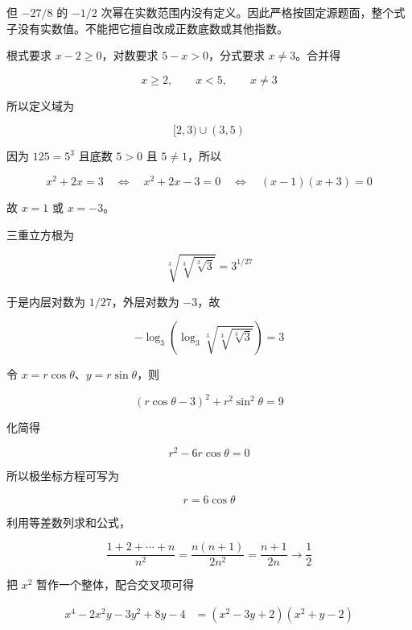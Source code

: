 \begin{answer}
但 $-27/8$ 的 $-1/2$ 次幂在实数范围内没有定义。因此严格按固定源题面，整个式子没有实数值。不能把它擅自改成正数底数或其他指数。


根式要求 $x-2\ge0$，对数要求 $5-x>0$，分式要求 $x\ne3$。合并得

\nopagebreak[4]
\[
x\ge2,\qquad x<5,\qquad x\ne3
\]

所以定义域为

\nopagebreak[4]
\[
[2,3)\cup(3,5)
\]


因为 $125=5^3$ 且底数 $5>0$ 且 $5\ne1$，所以

\nopagebreak[4]
\[
x^2+2x=3
\quad\Longleftrightarrow\quad
x^2+2x-3=0
\quad\Longleftrightarrow\quad
(x-1)(x+3)=0
\]

故 $x=1$ 或 $x=-3$。


三重立方根为

\nopagebreak[4]
\[
\sqrt[3]{\sqrt[3]{\sqrt[3]{3}}}=3^{1/27}
\]

于是内层对数为 $1/27$，外层对数为 $-3$，故

\nopagebreak[4]
\[
-\log_3\left(\log_3\sqrt[3]{\sqrt[3]{\sqrt[3]{3}}}\right)=3
\]


令 $x=r\cos\theta$、$y=r\sin\theta$，则

\nopagebreak[4]
\[
(r\cos\theta-3)^2+r^2\sin^2\theta=9
\]

化简得

\nopagebreak[4]
\[
r^2-6r\cos\theta=0
\]

所以极坐标方程可写为

\nopagebreak[4]
\[
r=6\cos\theta
\]


利用等差数列求和公式，

\nopagebreak[4]
\[
\frac{1+2+\cdots+n}{n^2}
=\frac{n(n+1)}{2n^2}
=\frac{n+1}{2n}
\longrightarrow\frac12
\]


把 $x^2$ 暂作一个整体，配合交叉项可得

\nopagebreak[4]
\[
\begin{aligned}
x^4-2x^2y-3y^2+8y-4
&=(x^2-3y+2)(x^2+y-2)
\end{aligned}
\]


\end{answer}
